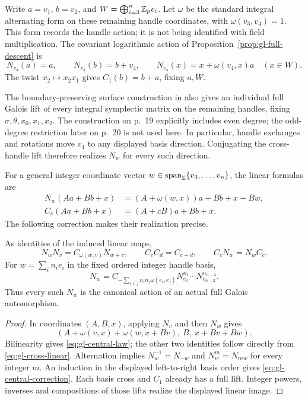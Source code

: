 Write $a=v_1$, $b=v_2$, and
$W=\bigoplus_{i=3}^n\mathbb Z_pv_i$. Let $\omega$ be the standard integral
alternating form on these remaining handle coordinates, with
$\omega(v_3,v_4)=1$. This form records the handle action; it is not
being identified with field multiplication. The covariant logarithmic
action of Proposition~\ref{prop:gl-full-descent} is
\[
 N_{v_4}(a)=a,\qquad N_{v_4}(b)=b+v_4,\qquad
 N_{v_4}(x)=x+\omega(v_4,x)a\quad(x\in W).
\]
The twist $x_2\mapsto x_2x_1$ gives $C_1(b)=b+a$, fixing $a,W$.

The boundary-preserving surface construction in
\cite[pp.~19--20 and Theorem~2.17]{KondoGalois} also gives an
individual full Galois lift of every integral symplectic matrix on
the remaining handles, fixing $\sigma,\theta,x_0,x_1,x_2$.
The construction on p.~19 explicitly includes even degree; the
odd-degree restriction later on p.~20 is not used here.
In particular, handle exchanges and rotations move $v_4$ to any
displayed basis direction. Conjugating the cross-handle lift
therefore realizes $N_w$ for every such direction.

For a general integer coordinate vector $w\in\operatorname{span}_\mathbb Z\{v_3,\ldots,v_n\}$,
the linear formulas are
\begin{equation}\label{eq:gl-cross-linear}
 \begin{aligned}
 N_w(Aa+Bb+x)&=(A+\omega(w,x))a+Bb+x+Bw,\\
 C_c(Aa+Bb+x)&=(A+cB)a+Bb+x.
 \end{aligned}
\end{equation}
The following correction makes their realization precise.

\begin{lemma}\label{lem:gl-central}
As identities of the induced linear maps,
\begin{equation}\label{eq:gl-central-law}
 N_wN_v=C_{\omega(w,v)}N_{w+v},\qquad
 C_cC_d=C_{c+d},\qquad C_cN_w=N_wC_c.
\end{equation}
For $w=\sum_i n_i e_i$ in the fixed ordered integer handle basis,
\begin{equation}\label{eq:gl-central-correction}
 N_w=C_{-\sum_{i<j}n_i n_j\omega(e_i,e_j)}
                N_{e_1}^{n_1}\cdots N_{e_{n-2}}^{n_{n-2}}.
\end{equation}
Thus every such $N_w$ is the canonical action of an actual full
Galois automorphism.
\end{lemma}
\begin{proof}
In coordinates $(A,B,x)$, applying $N_v$ and then $N_w$ gives
\[
 (A+\omega(v,x)+\omega(w,x+Bv),\ B,\ x+Bv+Bw).
\]
Bilinearity gives \eqref{eq:gl-central-law}; the other two identities
follow directly from \eqref{eq:gl-cross-linear}. Alternation implies
$N_w^{-1}=N_{-w}$ and $N_w^m=N_{mw}$ for every integer $m$.
An induction in the displayed left-to-right basis order gives
\eqref{eq:gl-central-correction}. Each basis cross and $C_1$ already
has a full lift. Integer powers, inverses and compositions of those
lifts realize the displayed linear image.
\end{proof}


